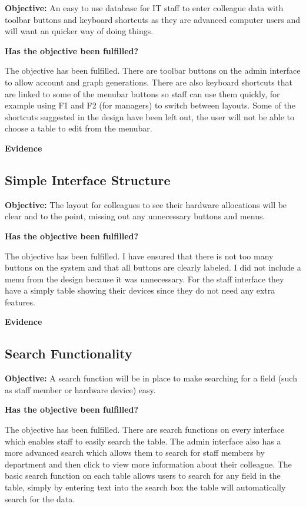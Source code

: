 \textbf{Objective:} An easy to use database for IT staff to enter colleague data with toolbar buttons and keyboard shortcuts as they are advanced computer users and will want an quicker way of doing things.

\textbf{Has the objective been fulfilled?}

The objective has been fulfilled. There are toolbar buttons on the admin interface to allow account and graph generations. There are also keyboard shortcuts that are linked to some of the menubar buttons so staff can use them quickly, for example using F1 and F2 (for managers) to switch between layouts. Some of the shortcuts suggested in the design have been left out, the user will not be able to choose a table to edit from the menubar. 

\textbf{Evidence}


\subsection{Simple Interface Structure}

\textbf{Objective:} The layout for colleagues to see their hardware allocations will be clear and to the point, missing out any unnecessary buttons and menus.

\textbf{Has the objective been fulfilled?}

The objective has been fulfilled. I have ensured that there is not too many buttons on the system and that all buttons are clearly labeled. I did not include a menu from the design because it was unnecessary. For the staff interface they have a simply table showing their devices  since they do not need any extra features. 

\textbf{Evidence}


\subsection{Search Functionality}\label{search}

\textbf{Objective:} A search function will be in place to make searching for a field (such as staff member or hardware device) easy.

\textbf{Has the objective been fulfilled?}

The objective has been fulfilled. There are search functions on every interface which enables staff to easily search the table. The admin interface also has a more advanced search which allows them to search for staff members by department and then click to view more information about their colleague. The basic search function on each table allows users to search for any field in the table, simply by entering text into the search box the table will automatically search for the data.

